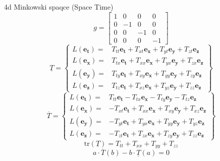 \documentclass[10pt,fleqn]{report}
\newcommand{\lp}{\left (}
\newcommand{\rp}{\right )}
\newcommand{\f}[2]{{#1}\lp{#2}\rp}
\begin{document}
4d Minkowski spaqce (Space Time)
\begin{equation*} g = \left[\begin{matrix}1 & 0 & 0 & 0\\0 & -1 & 0 & 0\\0 & 0 & -1 & 0\\0 & 0 & 0 & -1\end{matrix}\right] \end{equation*}
\begin{equation*} \underline{T} = \left \{ \begin{array}{ll} L \left ( \boldsymbol{e_{t}}\right ) =& T_{tt} \boldsymbol{e_{t}} + T_{xt} \boldsymbol{e_{x}} + T_{yt} \boldsymbol{e_{y}} + T_{zt} \boldsymbol{e_{z}} \\ L \left ( \boldsymbol{e_{x}}\right ) =& T_{tx} \boldsymbol{e_{t}} + T_{xx} \boldsymbol{e_{x}} + T_{yx} \boldsymbol{e_{y}} + T_{zx} \boldsymbol{e_{z}} \\ L \left ( \boldsymbol{e_{y}}\right ) =& T_{ty} \boldsymbol{e_{t}} + T_{xy} \boldsymbol{e_{x}} + T_{yy} \boldsymbol{e_{y}} + T_{zy} \boldsymbol{e_{z}} \\ L \left ( \boldsymbol{e_{z}}\right ) =& T_{tz} \boldsymbol{e_{t}} + T_{xz} \boldsymbol{e_{x}} + T_{yz} \boldsymbol{e_{y}} + T_{zz} \boldsymbol{e_{z}}  \end{array} \right \} \end{equation*}
\begin{equation*} \overline{T} = \left \{ \begin{array}{ll} L \left ( \boldsymbol{e_{t}}\right ) =& T_{tt} \boldsymbol{e_{t}} - T_{tx} \boldsymbol{e_{x}} - T_{ty} \boldsymbol{e_{y}} - T_{tz} \boldsymbol{e_{z}} \\ L \left ( \boldsymbol{e_{x}}\right ) =& - T_{xt} \boldsymbol{e_{t}} + T_{xx} \boldsymbol{e_{x}} + T_{xy} \boldsymbol{e_{y}} + T_{xz} \boldsymbol{e_{z}} \\ L \left ( \boldsymbol{e_{y}}\right ) =& - T_{yt} \boldsymbol{e_{t}} + T_{yx} \boldsymbol{e_{x}} + T_{yy} \boldsymbol{e_{y}} + T_{yz} \boldsymbol{e_{z}} \\ L \left ( \boldsymbol{e_{z}}\right ) =& - T_{zt} \boldsymbol{e_{t}} + T_{zx} \boldsymbol{e_{x}} + T_{zy} \boldsymbol{e_{y}} + T_{zz} \boldsymbol{e_{z}}  \end{array} \right \} \end{equation*}
\begin{equation*} \f{\mbox{tr}}{\underline{T}} = T_{tt} + T_{xx} + T_{yy} + T_{zz} \end{equation*}
\begin{equation*} a\cdot \f{\overline{T}}{b}-b\cdot \f{\underline{T}}{a} = 0 \end{equation*}
\end{document}
